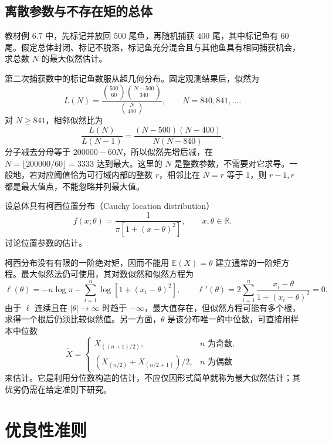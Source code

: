 \subsection{离散参数与不存在矩的总体}

\begin{example}
\label{ex:study-capture-mle}
教材例 6.7 中，先标记并放回 $500$ 尾鱼，再随机捕获 $400$ 尾，其中标记鱼有 $60$ 尾。假定总体封闭、标记不脱落，标记鱼充分混合且与其他鱼具有相同捕获机会，求总数 $N$ 的最大似然估计。
\end{example}

\begin{solve}
第二次捕获数中的标记鱼数服从超几何分布。固定观测结果后，似然为
\[
  L(N)=\frac{\binom{500}{60}\binom{N-500}{340}}{\binom N{400}},
  \qquad N=840,841,\ldots.
\]
对 $N\ge841$，相邻似然比为
\[
  \frac{L(N)}{L(N-1)}
    =\frac{(N-500)(N-400)}{N(N-840)}.
\]
分子减去分母等于 $200000-60N$，所以似然先增后减，在 $N=\lfloor200000/60\rfloor=3333$ 达到最大。这里的 $N$ 是整数参数，不需要对它求导。一般地，若对应阈值恰为可行域内部的整数 $r$，相邻比在 $N=r$ 等于 $1$，则 $r-1,r$ 都是最大值点，不能忽略并列最大值。
\end{solve}

\begin{example}
\label{ex:study-cauchy-location}
设总体具有柯西位置分布（Cauchy location distribution）
\[
  f(x;\theta)=\frac1{\pi[1+(x-\theta)^2]},
  \qquad x,\theta\in\mathbb R.
\]
讨论位置参数的估计。
\end{example}

\begin{solve}
柯西分布没有有限的一阶绝对矩，因而不能用 $\mathbb E(X)=\theta$ 建立通常的一阶矩方程。最大似然法仍可使用，其对数似然和似然方程为
\[
  \ell(\theta)=-n\log\pi-\sum_{i=1}^n\log[1+(x_i-\theta)^2],
  \qquad
  \ell'(\theta)=2\sum_{i=1}^n\frac{x_i-\theta}{1+(x_i-\theta)^2}=0.
\]
由于 $\ell$ 连续且在 $|\theta|\to\infty$ 时趋于 $-\infty$，最大值存在，但似然方程可能有多个根，求得一个根后仍须比较似然值。另一方面，$\theta$ 是该分布唯一的中位数，可直接用样本中位数
\[
  \widetilde X=
  \begin{cases}
    X_{((n+1)/2)},&n\text{ 为奇数},\\
    (X_{(n/2)}+X_{(n/2+1)})/2,&n\text{ 为偶数}
  \end{cases}
\]
来估计。它是利用分位数构造的估计，不应仅因形式简单就称为最大似然估计；其优劣仍需在给定准则下研究。
\end{solve}

\section{优良性准则}
\label{sec:study-estimator-criteria}

